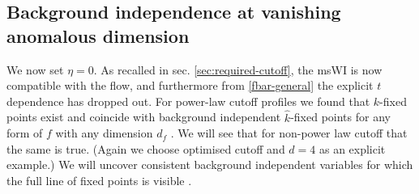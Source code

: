 \documentclass[11pt,a4paper]{article}
\numberwithin{figure}{section}
\numberwithin{equation}{section}
\newcommand{\hk}{\hat k} %
\begin{document}
\subsection{Background independence at vanishing anomalous dimension}\label{sec:works}
We now set $\eta=0$. As recalled in sec. \ref{sec:required-cutoff}, the msWI is now compatible with the flow, and furthermore  from \eqref{fbar-general} the explicit $t$ dependence has dropped out.
For power-law cutoff profiles we found that $k$-fixed points exist and coincide with background independent $\hk$-fixed points for any form of $f$ with any dimension $d_f$ \cite{Dietz:2015owa}. We will see that for non-power law cutoff that the same is true. (Again we choose optimised cutoff and $d=4$ as an explicit example.) We will uncover consistent background independent variables for which the full line of fixed points is visible \cite{Dietz2016}. 
\end{document}

